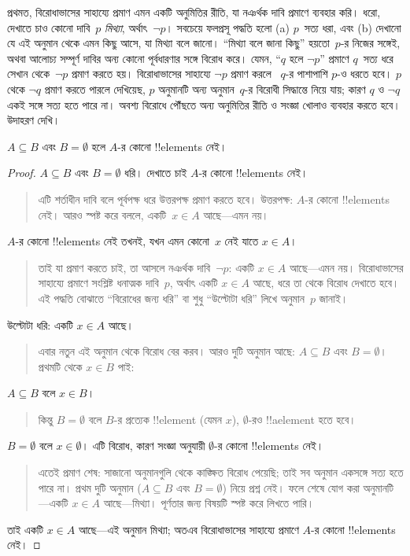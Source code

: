 \documentclass[../../../include/open-logic-section]{subfiles}
\begin{document}


প্রথমত, বিরোধাভাসের সাহায্যে প্রমাণ এমন একটি অনুমিতির রীতি,
যা নঞর্থক দাবি প্রমাণে ব্যবহার করি। ধরো, দেখাতে চাও
কোনো দাবি~$p$ \emph{মিথ্যা}, অর্থাৎ~$\lnot p$। সবচেয়ে
ফলপ্রসূ পদ্ধতি হলো (a) $p$~সত্য ধরা, এবং (b) দেখানো
যে এই অনুমান থেকে এমন কিছু আসে, যা মিথ্যা বলে জানো।
``মিথ্যা বলে জানা কিছু'' হয়তো~$p$-র নিজের সঙ্গেই,
অথবা আলোচ্য সম্পূর্ণ দাবির অন্য কোনো পূর্বধারণার সঙ্গে
বিরোধ করে। যেমন, ``$q$ হলে $\lnot p$'' প্রমাণে
$q$~সত্য ধরে সেখান থেকে~$\lnot p$ প্রমাণ করতে
হয়। বিরোধাভাসের সাহায্যে $\lnot p$ প্রমাণ করলে
~$q$-র পাশাপাশি $p$-ও ধরতে হবে। $p$ থেকে
$\lnot q$ প্রমাণ করতে পারলে দেখিয়েছ, $p$
অনুমানটি অন্য অনুমান~$q$-র বিরোধী সিদ্ধান্তে নিয়ে
যায়; কারণ $q$ ও $\lnot q$ একই সঙ্গে সত্য হতে
পারে না। অবশ্য বিরোধে পৌঁছতে অন্য অনুমিতির
রীতি ও সংজ্ঞা খোলাও ব্যবহার করতে হবে। উদাহরণ দেখি।

\begin{prop}
  $A \subseteq B$ এবং $B = \emptyset$ হলে $A$-র
  কোনো !!{element}s নেই।
\end{prop}

\begin{proof}
  $A \subseteq B$ এবং $B = \emptyset$ ধরি।
  দেখাতে চাই $A$-র কোনো !!{element}s নেই।
  \begin{quote}
    এটি শর্তাধীন দাবি বলে পূর্বপক্ষ ধরে উত্তরপক্ষ
    প্রমাণ করতে হবে। উত্তরপক্ষ: $A$-র কোনো
    !!{element}s নেই। আরও স্পষ্ট করে বললে,
    একটি~$x \in A$ আছে—এমন নয়।
  \end{quote}
  $A$-র কোনো !!{element}s নেই তখনই, যখন এমন
  কোনো~$x$ নেই যাতে $x \in A$।
  \begin{quote}
    তাই যা প্রমাণ করতে চাই, তা আসলে নঞর্থক
    দাবি~$\lnot p$: একটি $x \in A$ আছে—এমন
    নয়। বিরোধাভাসের সাহায্যে প্রমাণে সংশ্লিষ্ট
    ধনাত্মক দাবি~$p$, অর্থাৎ একটি $x \in A$ আছে,
    ধরে তা থেকে বিরোধ দেখাতে হবে। এই পদ্ধতি
    বোঝাতে ``বিরোধের জন্য ধরি'' বা শুধু ``উল্টোটা
    ধরি'' লিখে অনুমান~$p$ জানাই।
  \end{quote}
  উল্টোটা ধরি: একটি $x \in A$ আছে।
  \begin{quote}
    এবার নতুন এই অনুমান থেকে বিরোধ বের করব।
    আরও দুটি অনুমান আছে: $A \subseteq B$ এবং
    $B = \emptyset$। প্রথমটি থেকে $x \in B$ পাই:
  \end{quote}
  $A \subseteq B$ বলে $x \in B$।
  \begin{quote}
    কিন্তু $B = \emptyset$ বলে $B$-র প্রত্যেক
    !!{element} (যেমন $x$), $\emptyset$-রও
    !!a{element} হতে হবে।
  \end{quote}
  $B = \emptyset$ বলে $x \in \emptyset$। এটি
  বিরোধ, কারণ সংজ্ঞা অনুযায়ী $\emptyset$-র কোনো
  !!{element}s নেই।
  \begin{quote}
    এতেই প্রমাণ শেষ: সাজানো অনুমানগুলি থেকে
    কাঙ্ক্ষিত বিরোধ পেয়েছি; তাই সব অনুমান
    একসঙ্গে সত্য হতে পারে না। প্রথম দুটি অনুমান
    ($A \subseteq B$ এবং $B = \emptyset$) নিয়ে
    প্রশ্ন নেই। ফলে শেষে যোগ করা অনুমানটি—একটি
    $x \in A$ আছে—মিথ্যা। পূর্ণতার জন্য
    বিষয়টি স্পষ্ট করে লিখতে পারি।
  \end{quote}
  তাই একটি $x \in A$ আছে—এই অনুমান মিথ্যা;
  অতএব বিরোধাভাসের সাহায্যে প্রমাণে $A$-র
  কোনো !!{element}s নেই।
\end{proof}
\end{document}
